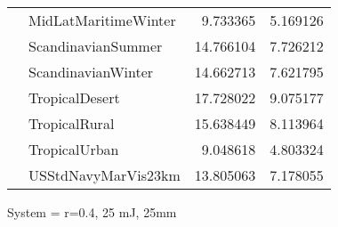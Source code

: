 \begin{tabular}{llrr}
             & MidLatMaritimeWinter &   9.733365 &   5.169126 \\
             & ScandinavianSummer &  14.766104 &   7.726212 \\
             & ScandinavianWinter &  14.662713 &   7.621795 \\
             & TropicalDesert &  17.728022 &   9.075177 \\
             & TropicalRural &  15.638449 &   8.113964 \\
             & TropicalUrban &   9.048618 &   4.803324 \\
             & USStdNavyMarVis23km &  13.805063 &   7.178055 \\
\bottomrule
\end{tabular}


\clearpage
System = r=0.4, 25 mJ, 25mm

